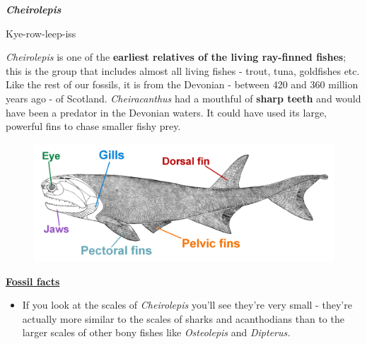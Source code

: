 \documentclass[12pt,letterpaper]{extarticle}
\begin{document}

{\Huge\textbf{\textit{Cheirolepis}}\par}
\vspace{3mm}
{\large{Kye-row-leep-iss} \par} 
\vspace{5mm}
\textit\textit{Cheirolepis} is one of the \textbf{earliest relatives of the living ray-finned fishes}; this is the group that includes almost all living fishes - trout, tuna, goldfishes etc.  Like the rest of our fossils, it is from the Devonian - between 420 and 360 million years ago - of Scotland. \textit{Cheiracanthus} had a mouthful of \textbf{sharp teeth} and would have been a predator in the Devonian waters.  It could have used its large, powerful fins to chase smaller fishy prey. \newline

\begin{figure}[h!]
\includegraphics[scale=0.4]{Cheirolepis}
\centering
\end{figure}

{\large\textbf{\underline{Fossil facts}}\par}

\begin{itemize}
  \item If you look at the scales of \textit{Cheirolepis} you'll see they're very small - they're actually more similar to the scales of sharks and acanthodians than to the larger scales of other bony fishes like \textit{Osteolepis} and \textit{Dipterus.}
\end{itemize}
\end{document}
